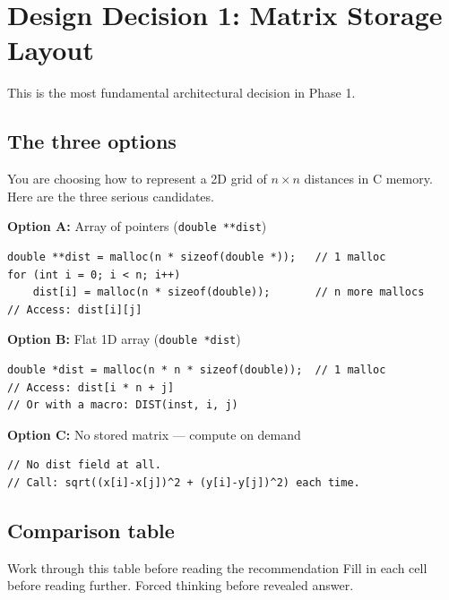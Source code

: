 \section{Design Decision 1: Matrix Storage Layout}

This is the most fundamental architectural decision in Phase 1.

\subsection{The three options}

You are choosing how to represent a 2D grid of $n \times n$ distances in C memory. Here are the three serious candidates.

\textbf{Option A:} Array of pointers (\texttt{double **dist})
\begin{lstlisting}[style=cstyle]
double **dist = malloc(n * sizeof(double *));   // 1 malloc
for (int i = 0; i < n; i++)
    dist[i] = malloc(n * sizeof(double));       // n more mallocs
// Access: dist[i][j]
\end{lstlisting}

\textbf{Option B:} Flat 1D array (\texttt{double *dist})
\begin{lstlisting}[style=cstyle]
double *dist = malloc(n * n * sizeof(double));  // 1 malloc
// Access: dist[i * n + j]
// Or with a macro: DIST(inst, i, j)
\end{lstlisting}

\textbf{Option C:} No stored matrix --- compute on demand
\begin{lstlisting}[style=cstyle]
// No dist field at all.
// Call: sqrt((x[i]-x[j])^2 + (y[i]-y[j])^2) each time.
\end{lstlisting}

\subsection{Comparison table}

\begin{inquiry}{Work through this table before reading the recommendation}
Fill in each cell before reading further. Forced thinking before revealed answer.
\end{inquiry}

